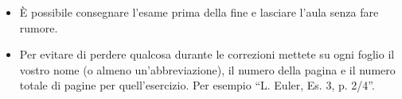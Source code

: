 \documentclass[12pt,a4paper]{article}
\begin{document}
\begin{itemize}
\item È possibile consegnare l'esame prima della fine e lasciare l'aula senza fare rumore.


\item Per evitare di perdere qualcosa durante le correzioni mettete su ogni foglio il vostro nome (o almeno un'abbreviazione), il numero della pagina e il numero totale di pagine per quell'esercizio. Per esempio ``L. Euler, Es. 3, p. 2/4''.



\end{itemize}
\end{document}
